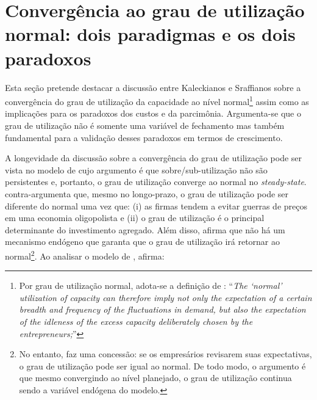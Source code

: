 
\section{Convergência ao grau de utilização normal: dois paradigmas e os dois paradoxos}\label{debate}

Esta seção pretende destacar a discussão entre Kaleckianos e Sraffianos sobre a convergência do grau de utilização da capacidade ao nível normal\footnote{Por grau de utilização normal, adota-se a definição de \textcites[p.~423--4, Original de 1986]{ciccone_2017}: ``\textit{The `normal' utilization of capacity can therefore imply not only the expectation of a certain breadth and frequency of the fluctuations in demand, but also the expectation of the idleness of the excess capacity deliberately chosen by the entrepreneurs;}'' } assim como as implicações para os paradoxos dos custos e da parcimônia. 
Argumenta-se que o grau de utilização não é somente uma variável de fechamento mas também fundamental para a validação desses paradoxos em termos de crescimento. 

A longevidade da discussão sobre a convergência do grau de utilização pode ser vista no modelo de \textcite{vianello_pace_1985} cujo argumento é que sobre/sub-utilização não são persistentes e, portanto, o grau de utilização converge ao normal no \textit{steady-state}. \textcite{amadeo_role_1986} contra-argumenta que, mesmo no longo-prazo, o grau de utilização pode ser diferente do normal uma vez que: (i) as firmas tendem a evitar guerras de preços em uma economia oligopolista e (ii) o grau de utilização é o principal determinante do investimento agregado. Além disso, afirma que não há um mecanismo endógeno que garanta que o grau de utilização irá retornar ao normal\footnote{No entanto, faz uma concessão: se os empresários revisarem suas expectativas, o grau de utilização pode ser igual ao normal. De todo modo, o argumento é que mesmo convergindo ao nível planejado, o grau de utilização continua sendo a variável endógena do modelo.}. Ao analisar o modelo de \textcites[Original de 1986]{ciccone_2017}, afirma:

